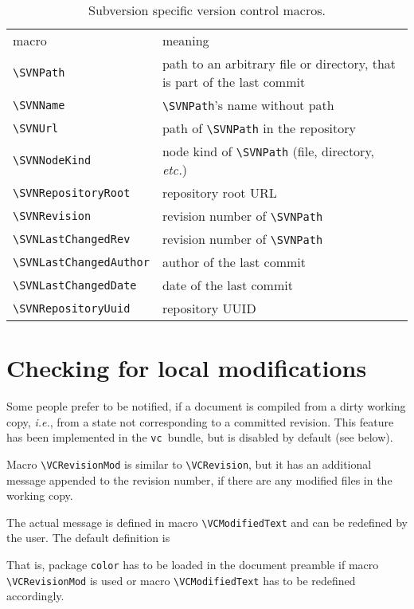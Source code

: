 \documentclass[11pt]{article}
\newcommand*{\pkg}{\texttt{vc}}
\newcommand*{\full}{\makebox[0pt][r]{${}^{\mbox{\footnotesize\textasteriskcentered}}$}}
\begin{document}
\begin{table}[p]
  \centering\small
  \begin{tabularx}{\textwidth}{p{12em}>{\raggedright\arraybackslash}X}
    macro & meaning\\\addlinespace \toprule\addlinespace
    \full\verb+\SVNPath+ & path to an arbitrary file or directory, that
    is part of the last commit\\
    \full\verb+\SVNName+ & \verb+\SVNPath+'s name without path\\
    \full\verb+\SVNUrl+ & path of \verb+\SVNPath+ in the repository\\
    \full\verb+\SVNNodeKind+ & node kind of \verb+\SVNPath+ (file,
    directory, \emph{etc.})\\
    \full\verb+\SVNRepositoryRoot+ & repository root URL\\
    \verb+\SVNRevision+ & revision number of \verb+\SVNPath+\\
    \verb+\SVNLastChangedRev+ & revision number of \verb+\SVNPath+\\
    \verb+\SVNLastChangedAuthor+ & author of the last commit\\
    \verb+\SVNLastChangedDate+ & date of the last commit\\
    \verb+\SVNRepositoryUuid+ & repository UUID\\
  \end{tabularx}
  \caption{Subversion specific version control macros.}
  \label{tab:vcSVNmacros}
\end{table}

\clearpage


\section{Checking for local modifications}
\label{sec:localmod}
Some people prefer to be notified, if a document is compiled from a
dirty working copy, \emph{i.e.}, from a state not corresponding to a
committed revision.  This feature has been implemented in the \pkg\
bundle, but is disabled by default (see below).

Macro \verb+\VCRevisionMod+ is similar to \verb+\VCRevision+, but it has
an additional message appended to the revision number, if there are any
modified files in the working copy.

The actual message is defined in macro \verb+\VCModifiedText+ and can be
redefined by the user.  The default definition is
\begin{listing}[style=TeX]
\gdef\VCModifiedText{\textcolor{red}{with local modifications!}}
\end{listing}
That is, package \texttt{color} has to be loaded in the document
preamble if macro \verb+\VCRevisionMod+ is used or macro
\verb+\VCModifiedText+ has to be redefined accordingly.
\end{document}
